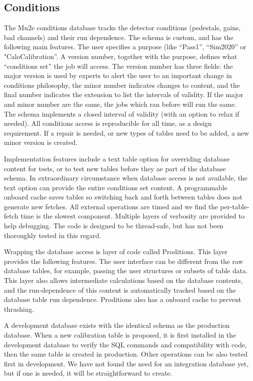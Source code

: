 \subsection{Conditions} \label{database-conditions}
The Mu2e conditions database tracks the detector conditions (pedestals, gains, bad channels) and their run dependence.  The schema is custom, and has the following main features.  The user specifies a purpose (like ``Pass1'', ``Sim2020'' or "CaloCalibration''.  A version number, together with the purpose, defines what ``conditions set'' the job will access. The version number has three fields: the major version is used by experts to alert the user to an important change in conditions philosophy, the minor number indicates changes to content, and the final number indicates the extension to list the intervals of validity.  If the major and minor number are the same, the jobs which ran before will run the same. The schema implements a closed interval of validity (with an option to relax if needed).  All conditions access is reproducible for all time, as a design requirement.  If a repair is needed, or new types of tables need to be added, a new minor version is created.

Implementation features include a text table option for overriding database content for tests, or to test new tables before they ae part of the database schema.  In extraordinary circumstance when database access is not available, the text option can provide the entire conditions set content. A programmable onboard cache saves tables so switching back and forth between tables does not generate new fetches.  All external operations are timed and we find the per-table-fetch time is the slowest component.  Multiple layers of verbosity are provided to help debugging.  The code is designed to be thread-safe, but has not been thoroughly tested in this regard.

Wrapping the database access is layer of code called Proditions.  This layer provides the following features.  The user interface can be different from the raw database tables, for example, passing the user structures or subsets of table data.  This layer also allows intermediate calculations based on the database contents, and the run-dependence of this content is automatically tracked based on the database table run dependence.  Proditions also has a onboard cache to prevent thrashing.

A development database exists with the identical schema as the production database. When a new calibration table is proposed, it is first installed in the development database to verify the SQL commands and compatibility with code, then the same table is created in production.  Other operations can be also tested first in development.  We have not found the need for an integration database yet, but if one is needed, it will be straightforward to create.

